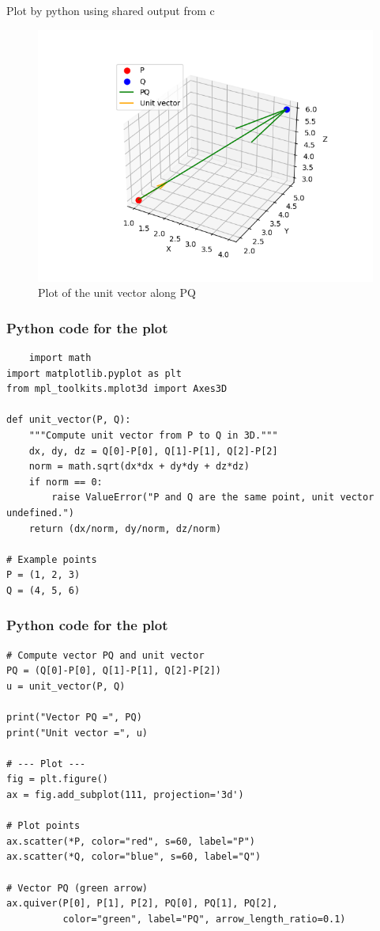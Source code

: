 \documentclass{beamer}
\begin{document}
\begin{frame}{Plot by python using shared output from c}
	\begin{center}
	\begin{figure}[H]
		\centering
		\includegraphics[width = 0.7\columnwidth]{figs/fig21.png}
		\caption{Plot of the unit vector along PQ}
		\label{fig1}
	\end{figure}
	\end{center}
\end{frame}
\begin{frame}[fragile]
     \frametitle{Python code for the plot}
\begin{lstlisting}
    import math
import matplotlib.pyplot as plt
from mpl_toolkits.mplot3d import Axes3D

def unit_vector(P, Q):
    """Compute unit vector from P to Q in 3D."""
    dx, dy, dz = Q[0]-P[0], Q[1]-P[1], Q[2]-P[2]
    norm = math.sqrt(dx*dx + dy*dy + dz*dz)
    if norm == 0:
        raise ValueError("P and Q are the same point, unit vector undefined.")
    return (dx/norm, dy/norm, dz/norm)

# Example points
P = (1, 2, 3)
Q = (4, 5, 6)
\end{lstlisting}
\end{frame}
\begin{frame}[fragile]
   \frametitle{Python code for the plot}
    \begin{lstlisting}
# Compute vector PQ and unit vector
PQ = (Q[0]-P[0], Q[1]-P[1], Q[2]-P[2])
u = unit_vector(P, Q)

print("Vector PQ =", PQ)
print("Unit vector =", u)

# --- Plot ---
fig = plt.figure()
ax = fig.add_subplot(111, projection='3d')

# Plot points
ax.scatter(*P, color="red", s=60, label="P")
ax.scatter(*Q, color="blue", s=60, label="Q")

# Vector PQ (green arrow)
ax.quiver(P[0], P[1], P[2], PQ[0], PQ[1], PQ[2],
          color="green", label="PQ", arrow_length_ratio=0.1)
 \end{lstlisting}
\end{frame}
\end{document}

